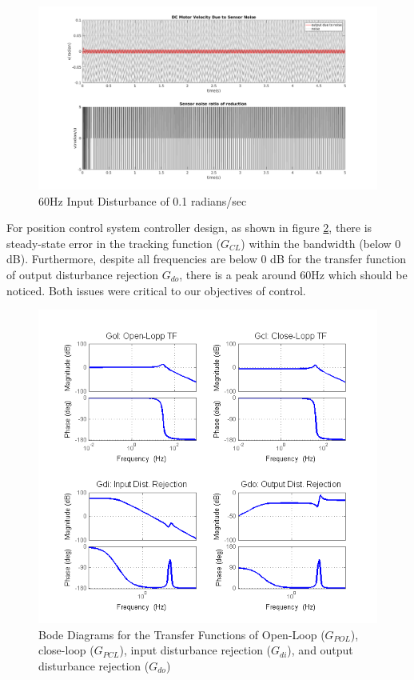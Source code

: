 \documentclass[letterpaper]{article}
\begin{document}
\begin{figure}[H]
\centering
\includegraphics[scale=0.3]{velocity_noise_60.png}
\caption{60Hz Input Disturbance of 0.1 radians/sec}
\label{q3_14}
\end{figure}

\clearpage

For position control system controller design, as shown in figure \ref{q3_16}, there is steady-state error in the tracking function ($G_{CL}$) within the bandwidth (below 0 dB). Furthermore, despite all frequencies are below 0 dB for the transfer function of output disturbance rejection $G_{do}$, there is a peak around 60Hz which should be noticed. Both issues were critical to our objectives of control.

\begin{figure}[H]
\begin{center}
\includegraphics[width = 16 cm]{q3_16}
\caption{Bode Diagrams for the Transfer Functions of Open-Loop ($G_{POL}$), close-loop ($G_{PCL}$), input disturbance rejection ($G_{di}$), and output disturbance rejection ($G_{do}$) }
\label{q3_16}
\end{center}
\end{figure}
\end{document}
